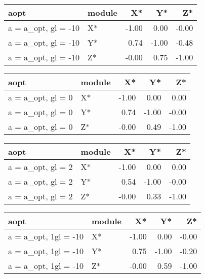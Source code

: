 \documentclass[10pt,a4paper]{article}
\begin{document}
\begin{table}[ht]
\centering
\begin{tabular}{llrrr}
  \hline
aopt & module & X* & Y* & Z* \\ 
  \hline
a = a\_opt, gl = -10 & X* & -1.00 & 0.00 & -0.00 \\ 
  a = a\_opt, gl = -10 & Y* & 0.74 & -1.00 & -0.48 \\ 
  a = a\_opt, gl = -10 & Z* & -0.00 & 0.75 & -1.00 \\ 
   \hline
\end{tabular}
\end{table}


\begin{table}[ht]
\centering
\begin{tabular}{llrrr}
  \hline
aopt & module & X* & Y* & Z* \\ 
  \hline
a = a\_opt, gl = 0 & X* & -1.00 & 0.00 & 0.00 \\ 
  a = a\_opt, gl = 0 & Y* & 0.74 & -1.00 & -0.00 \\ 
  a = a\_opt, gl = 0 & Z* & -0.00 & 0.49 & -1.00 \\ 
   \hline
\end{tabular}
\end{table}


\begin{table}[ht]
\centering
\begin{tabular}{llrrr}
  \hline
aopt & module & X* & Y* & Z* \\ 
  \hline
a = a\_opt, gl = 2 & X* & -1.00 & 0.00 & 0.00 \\ 
  a = a\_opt, gl = 2 & Y* & 0.54 & -1.00 & -0.00 \\ 
  a = a\_opt, gl = 2 & Z* & -0.00 & 0.33 & -1.00 \\ 
   \hline
\end{tabular}
\end{table}


\begin{table}[ht]
\centering
\begin{tabular}{llrrr}
  \hline
aopt & module & X* & Y* & Z* \\ 
  \hline
a = a\_opt, 1gl = -10 & X* & -1.00 & 0.00 & -0.00 \\ 
  a = a\_opt, 1gl = -10 & Y* & 0.75 & -1.00 & -0.20 \\ 
  a = a\_opt, 1gl = -10 & Z* & -0.00 & 0.59 & -1.00 \\ 
   \hline
\end{tabular}
\end{table}
\end{document}
